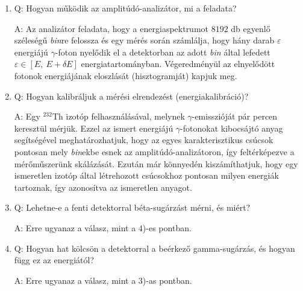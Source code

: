 \begin{enumerate}
    \item Q: Hogyan működik az amplitúdó-analizátor, mi a feladata?
    \begin{displayquote}
        A: Az analizátor feladata, hogy a energiaspektrumot $8192$ db egyenlő széleségű \emph{bin}re felossza és egy mérés során számlálja, hogy hány darab $\varepsilon$ energiájú $\gamma$-foton nyelődik el a detektorban az adott \emph{bin} által lefedett $\varepsilon \in \left[ E,\ E + \delta E \right]$ energiatartományban. Végeredményül az elnyelődött fotonok energiájának eloszlását (hisztogramját) kapjuk meg.
    \end{displayquote}
    
    \item Q: Hogyan kalibráljuk a mérési elrendezést (energiakalibráció)?
    \begin{displayquote}
        A: Egy $^{232}$Th izotóp felhasználásával, melynek $\gamma$-emisszióját pár percen keresztül mérjük. Ezzel az ismert energiájú $\gamma$-fotonokat kibocsájtó anyag segítségével meghatározhatjuk, hogy az egyes karakterisztikus csúcsok pontosan mely \emph{bin}ekbe esnek az amplitúdó-analizátoron, így feltérképezve a mérőműszerünk skálázását. Ezután már könnyedén kiszámíthatjuk, hogy egy ismeretlen izotóp által létrehozott csúcsokhoz pontosan milyen energiák tartoznak, így azonosítva az ismeretlen anyagot.
    \end{displayquote}
    
    \item Q: Lehetne-e a fenti detektorral béta-sugárzást mérni, és miért?
    \begin{displayquote}
        A: Erre ugyanaz a válasz, mint a $4$)-es pontban.
    \end{displayquote}
    
    \item Q: Hogyan hat kölcsön a detektorral a beérkező gamma-sugárzás, és hogyan függ ez az energiától?
    \begin{displayquote}
        A: Erre ugyanaz a válasz, mint a $3$)-as pontban.
    \end{displayquote}
    

\end{enumerate}
